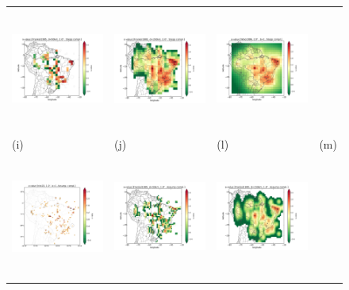 \documentclass[draft, grl]{agutex}
\begin{document}
\begin{figure}
\begin{center}
\begin{table}[H]
\begin{tabular}{ p{}
						 p{}
						 p{}
						 p{} }
		\includegraphics[height=4cm]{z_img_f_stepp_50_25} &
		\includegraphics[height=4cm]{z_img_f_stepp_150_25} &
		\includegraphics[height=4cm]{z_img_woo_stepp_25} 
		\\
		\footnotesize(i) &
		\footnotesize(j) &
		\footnotesize(l) &
		\footnotesize(m)
		\\
		\includegraphics[height=4cm]{z_img_2dhist_assump_50}  &
		\includegraphics[height=4cm]{z_img_f_assump_50_50} &
		\includegraphics[height=4cm]{z_img_f_assump_150_50} &

\end{tabular}
\end{table}
\end{center}
\end{figure}
\end{document}

